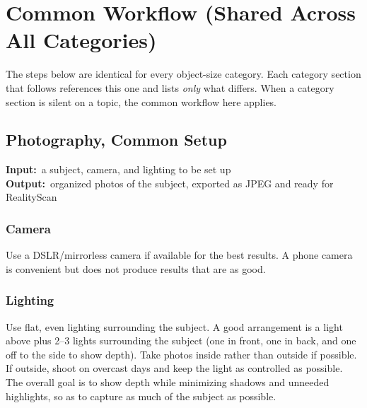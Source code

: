 \documentclass[11pt]{article}
\newcommand{\inout}[2]{%
    \begin{stageio}%
    \textbf{Input:}~#1\\[2pt]%
    \textbf{Output:}~#2%
    \end{stageio}%
}
\begin{document}
\section{Common Workflow (Shared Across All Categories)}
\label{sec:common}
The steps below are identical for every object-size category. Each category section that follows references this one and lists \emph{only} what differs. When a category section is silent on a topic, the common workflow here applies.

\subsection{Photography, Common Setup}
\label{sec:common-photo}
\inout{a subject, camera, and lighting to be set up}{organized photos of the subject, exported as JPEG and ready for RealityScan}

\subsubsection{Camera}
Use a DSLR/mirrorless camera if available for the best results. A phone camera is convenient but does not produce results that are as good.

\subsubsection{Lighting}
Use flat, even lighting surrounding the subject. A good arrangement is a light above plus 2--3 lights surrounding the subject (one in front, one in back, and one off to the side to show depth). Take photos inside rather than outside if possible. If outside, shoot on overcast days and keep the light as controlled as possible. The overall goal is to show depth while minimizing shadows and unneeded highlights, so as to capture as much of the subject as possible.
\end{document}
